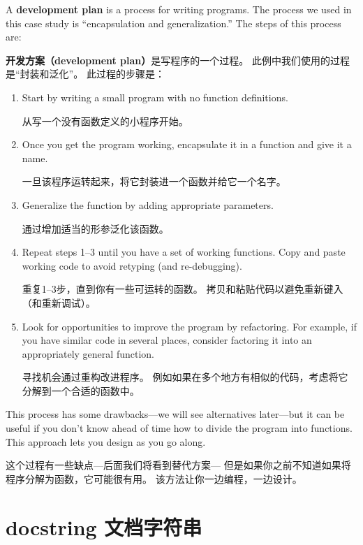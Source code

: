 \documentclass[10pt]{book}
\begin{document}
\begin{CJK}{UTF8}{gbsn}
A {\bf development plan} is a process for writing programs.
The process we used
in this case study is ``encapsulation and
generalization.''  The steps of this process are:

{\bf 开发方案（development plan）}是写程序的一个过程。
此例中我们使用的过程是``封装和泛化''。
此过程的步骤是：

\begin{enumerate}

\item Start by writing a small program with no function definitions.

从写一个没有函数定义的小程序开始。

\item Once you get the program working, encapsulate it in a function
and give it a name.

一旦该程序运转起来，将它封装进一个函数并给它一个名字。

\item Generalize the function by adding appropriate parameters.

通过增加适当的形参泛化该函数。

\item Repeat steps 1--3 until you have a set of working functions.
Copy and paste working code to avoid retyping (and re-debugging).

重复1--3步，直到你有一些可运转的函数。
拷贝和粘贴代码以避免重新键入（和重新调试）。

\item Look for opportunities to improve the program by refactoring.
For example, if you have similar code in several places, consider
factoring it into an appropriately general function.

寻找机会通过重构改进程序。
例如如果在多个地方有相似的代码，考虑将它分解到一个合适的函数中。

\end{enumerate}

This process has some drawbacks---we will see alternatives later---but
it can be useful if you don't know ahead of time how to divide the
program into functions.  This approach lets you design as you go
along.

这个过程有一些缺点---后面我们将看到替代方案---
但是如果你之前不知道如果将程序分解为函数，它可能很有用。
该方法让你一边编程，一边设计。


\section{docstring 文档字符串}
\label{docstring}


\end{CJK}
\end{document}
